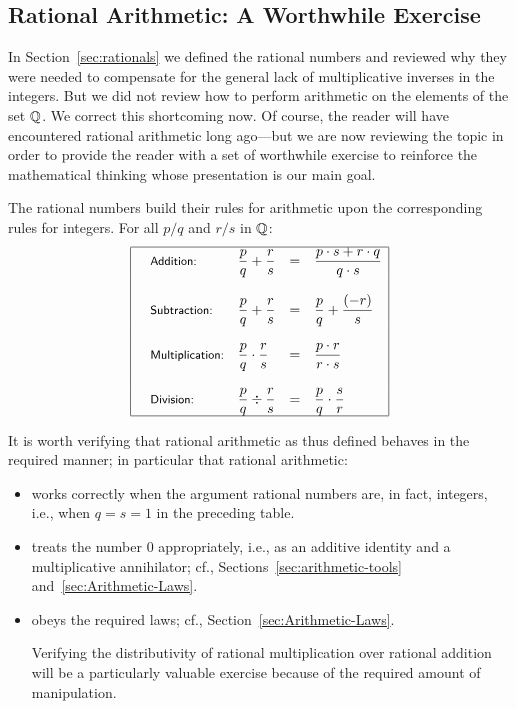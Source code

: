 \subsection{Rational Arithmetic: A Worthwhile Exercise}
\label{sec:Rational-arithmetic}

In Section~\ref{sec:rationals} we defined the rational numbers and
reviewed why they were needed to compensate for the general lack of
multiplicative inverses in the integers.  But we did not review how to
perform arithmetic on the elements of the set $\mathbb{Q}$.  We correct this
shortcoming now.  Of course, the reader will have encountered rational
arithmetic long ago---but we are now reviewing the topic in order to
provide the reader with a set of worthwhile exercise to reinforce the
mathematical thinking whose presentation is our main goal.

\medskip

The rational numbers build their rules for arithmetic upon the
corresponding rules for integers.  For all $p/q$ and $r/s$ in $\mathbb{Q}$:
\[
\begin{array}{|llcl|}
\hline
\mbox{\small\sf Addition:} & 
{\displaystyle
{p \over q} + {r \over s} }
  & = &
{\displaystyle
 \frac{p \cdot s + r \cdot q}{q \cdot s} }  \\
 & & & \\
\mbox{\small\sf Subtraction:} &
{\displaystyle
{p \over q} + {r \over s} }
  & = & 
{\displaystyle
{p \over q} + {(-r) \over s} } \\
 & & & \\
\mbox{\small\sf Multiplication:} &
{\displaystyle
{p \over q} \cdot {r \over s} }
  & = & 
{\displaystyle
\frac{p \cdot r}{r \cdot s} } \\
  & & & \\
\mbox{\small\sf Division:} &
{\displaystyle
{p \over q} \div {r \over s} }
  & = &
{\displaystyle
{p \over q} \cdot {s \over r} } \\
\hline
\end{array}
\]

It is worth verifying that rational arithmetic as thus defined behaves
in the required manner; in particular that rational arithmetic:
\begin{itemize}
\item
works correctly when the argument rational numbers are, in fact,
integers, i.e., when $q = s = 1$ in the preceding table.
\item
treats the number $0$ appropriately, i.e., as an additive identity and
a multiplicative annihilator; cf., Sections~\ref{sec:arithmetic-tools}
and~\ref{sec:Arithmetic-Laws}.
\item
obeys the required laws; cf., Section~\ref{sec:Arithmetic-Laws}.

Verifying the distributivity of rational multiplication over rational
addition will be a particularly valuable exercise because of the
required amount of manipulation.
\end{itemize}

